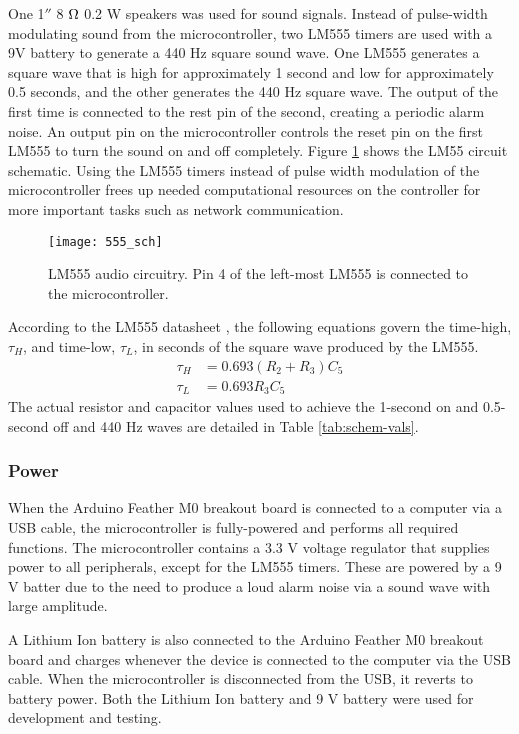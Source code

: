 One 1$''$ 8 $\ohm$ 0.2 W speakers was used for sound signals. Instead of pulse-width modulating sound from the microcontroller, two LM555 timers are used with a 9V battery to generate a 440 Hz square sound wave. One LM555 generates a square wave that is high for approximately 1 second and low for approximately 0.5 seconds, and the other generates the 440 Hz square wave. The output of the first time is connected to the rest pin of the second, creating a periodic alarm noise. An output pin on the microcontroller controls the reset pin on the first LM555 to turn the sound on and off completely. Figure \ref{fig:555schem} shows the LM55 circuit schematic. Using the LM555 timers instead of pulse width modulation of the microcontroller frees up needed computational resources on the controller for more important tasks such as network communication.

\begin{figure}[h]
\begin{center}
\texttt{[image: 555\_sch]}
\caption{LM555 audio circuitry. Pin 4 of the left-most LM555 is connected to the microcontroller.}
\label{fig:555schem}
\end{center}
\end{figure}

According to the LM555 datasheet \cite{lm555}, the following equations govern the time-high, $\tau_H$, and time-low, $\tau_L$, in seconds of the square wave produced by the LM555.
\begin{align*}
    \tau_H &= 0.693(R_2 + R_3)C_5 \\
    \tau_L &= 0.693R_3C_5    
\end{align*}
The actual resistor and capacitor values used to achieve the 1-second on and 0.5-second off and 440 Hz waves are detailed in Table \ref{tab:schem-vals}.

\subsubsection{Power}

When the Arduino Feather M0 breakout board is connected to a computer via a USB cable, the microcontroller is fully-powered and performs all required functions. The microcontroller contains a 3.3 V voltage regulator that supplies power to all peripherals, except for the LM555 timers. These are powered by a 9 V batter due to the need to produce a loud alarm noise via a sound wave with large amplitude.

A Lithium Ion battery is also connected to the Arduino Feather M0 breakout board and charges whenever the device is connected to the computer via the USB cable. When the microcontroller is disconnected from the USB, it reverts to battery power. Both the Lithium Ion battery and 9 V battery were used for development and testing.

